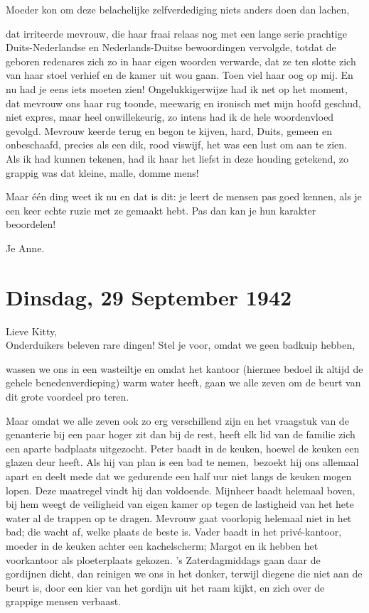 \documentclass{book}
\begin{document}
Moeder kon om deze belachelijke zelfverdediging niets anders doen dan
lachen,

dat irriteerde mevrouw, die haar fraai relaas nog met een lange serie
prachtige Duits-Nederlandse en Nederlands-Duitse bewoordingen vervolgde,
totdat de geboren redenares zich zo in haar eigen woorden verwarde, dat
ze ten slotte zich van haar stoel verhief en de kamer uit wou gaan. Toen
viel haar oog op mij. En nu had je eens iets moeten zien!
Ongelukkigerwijze had ik net op het moment, dat mevrouw ons haar rug
toonde, meewarig en ironisch met mijn hoofd geschud, niet expres, maar
heel onwillekeurig, zo intens had ik de hele woordenvloed gevolgd.
Mevrouw keerde terug en begon te kijven, hard, Duits, gemeen en
onbeschaafd, precies als een dik, rood viswijf, het was een lust om aan
te zien. Als ik had kunnen tekenen, had ik haar het liefst in deze
houding getekend, zo grappig was dat kleine, malle, domme mens!

Maar één ding weet ik nu en dat is dit: je leert de mensen pas goed
kennen, als je een keer echte ruzie met ze gemaakt hebt. Pas dan kan je
hun karakter beoordelen!

Je Anne.

\chapter{Dinsdag, 29 September 1942}

Lieve Kitty,\\Onderduikers beleven rare dingen! Stel je voor, omdat we
geen badkuip hebben,

wassen we ons in een wasteiltje en omdat het kantoor (hiermee bedoel ik
altijd de gehele benedenverdieping) warm water heeft, gaan we alle zeven
om de beurt van dit grote voordeel pro teren.

Maar omdat we alle zeven ook zo erg verschillend zijn en het vraagstuk
van de genanterie bij een paar hoger zit dan bij de rest, heeft elk lid
van de familie zich een aparte badplaats uitgezocht. Peter baadt in de
keuken, hoewel de keuken een glazen deur heeft. Als hij van plan is een
bad te nemen,~bezoekt hij ons allemaal apart en deelt mede dat we
gedurende een half uur niet langs de keuken mogen lopen. Deze maatregel
vindt hij dan voldoende. Mijnheer baadt helemaal boven, bij hem weegt de
veiligheid van eigen kamer op tegen de lastigheid van het hete water al
de trappen op te dragen. Mevrouw gaat voorlopig helemaal niet in het
bad; die wacht af, welke plaats de beste is. Vader baadt in het
privé-kantoor, moeder in de keuken achter een kachelscherm; Margot en ik
hebben het voorkantoor als ploeterplaats gekozen. 's Zaterdagmiddags
gaan daar de gordijnen dicht, dan reinigen we ons in het donker, terwijl
diegene die niet aan de beurt is, door een kier van het gordijn uit het
raam kijkt, en zich over de grappige mensen verbaast.
\end{document}
